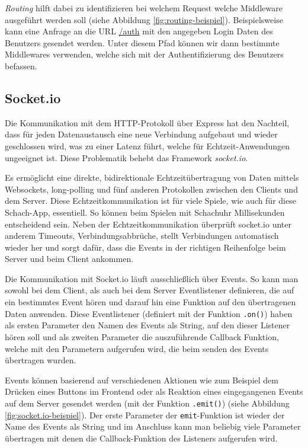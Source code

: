 \documentclass[a4paper,12pt]{report}
\begin{document}
\textit{Routing} hilft dabei zu identifizieren bei welchem Request welche Middleware ausgeführt	werden soll (siehe Abbildung \ref{fig:routing-beispiel}). Beispielsweise kann eine Anfrage an die URL \url{/auth} mit den angegeben Login Daten des Benutzers gesendet werden. Unter diesem Pfad können wir dann bestimmte Middlewares verwenden, welche sich mit der Authentifizierung des Benutzers befassen.
        \subsection{Socket.io}
        \label{sec:socket.io}
Die Kommunikation mit dem HTTP-Protokoll über Express hat den Nachteil, dass für jeden Datenaustausch eine neue Verbindung aufgebaut und wieder geschlossen wird, was zu einer Latenz führt, welche für Echtzeit-Anwendungen ungeeignet ist. Diese Problematik behebt das Framework \textit{socket.io}. %

Es ermöglicht eine direkte, bidirektionale Echtzeitübertragung von Daten mittels Websockets, long-polling und fünf anderen Protokollen zwischen den Clients und dem Server. Diese Echtzeitkommunikation ist für viele Spiele, wie auch für diese Schach-App, essentiell. So können beim Spielen mit Schachuhr Millisekunden entscheidend sein.
Neben der Echtzeitkommunikation überprüft socket.io unter anderem Timeouts, Verbindungsabbrüche, stellt Verbindungen automatisch wieder her und sorgt dafür, dass die Events in der richtigen Reihenfolge beim Server und beim Client ankommen. 

Die Kommunikation mit Socket.io läuft ausschließlich über Events. So kann man sowohl bei dem Client, als auch bei dem Server Eventlistener definieren, die auf ein bestimmtes Event hören und darauf hin eine Funktion auf den übertragenen Daten anwenden. Diese Eventlistener (definiert mit der Funktion \verb|.on()|) haben als ersten Parameter den Namen des Events als String, auf den dieser Listener hören soll und als zweiten Parameter die auszuführende Callback Funktion, welche mit den Parametern aufgerufen wird, die beim senden des Events übertragen wurden.

Events können basierend auf verschiedenen Aktionen wie zum Beispiel dem Drücken eines Buttons im Frontend oder als Reaktion eines eingegangenen Events auf dem Server gesendet werden (mit der Funktion \verb|.emit()|) (siehe Abbildung \ref{fig:socket.io-beispiel}). Der erste Parameter der \verb|emit|-Funktion ist wieder der Name des Events als String und im Anschluss kann man beliebig viele Parameter übertragen mit denen die Callback-Funktion des Listeners aufgerufen wird.
\end{document}
